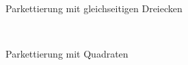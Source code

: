 \documentclass{article}
\begin{document}
\begin{figure}[!ht]
  \centering
  \qquad
  \\
  \caption{Parkettierung mit gleichseitigen Dreiecken}
  \label{fig:tess_triangle}
\end{figure}

\begin{figure}[!ht]
  \centering
  \qquad
  \\
  \caption{Parkettierung mit Quadraten}
  \label{fig:tess_square}
\end{figure}
\end{document}
